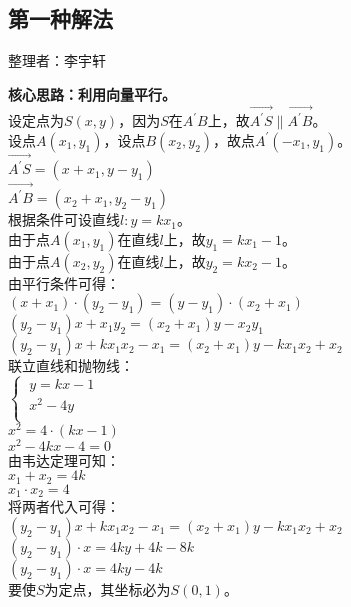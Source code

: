 \documentclass[UTF8]{ctexart}
\begin{document}
\newpage

\subsection{第一种解法}
    \begin{center}
        整理者：李宇轩
    \end{center}
    \begin{multicols}{2}
        \small
        \textbf{核心思路：利用向量平行。}\\[5mm]
        设定点为$S(x,y)$，因为$S$在$A^{'}B$上，故$\overrightarrow{A^{'}S}\parallel\overrightarrow{A^{'}B}$。\\[5mm]
        设点$A(x_1,y_1)$，设点$B(x_2,y_2)$，故点$A^{'}(-x_1,y_1)$。\\[5mm]
        $\overrightarrow{A^{'}S}=(x+x_1,y-y_1)$\\[5mm]
        $\overrightarrow{A^{'}B}=(x_2+x_1,y_2-y_1)$\\[7mm]
        根据条件可设直线$l:y=kx_1$。\\[5mm]
        由于点$A(x_1,y_1)$在直线$l$上，故$y_1=kx_1-1$。\\[5mm]
        由于点$A(x_2,y_2)$在直线$l$上，故$y_2=kx_2-1$。\\[8mm]
        由平行条件可得：\\[3mm]
        $(x+x_1)\cdot (y_2-y_1)=(y-y_1)\cdot (x_2+x_1)$\\[5mm]
        $(y_2-y_1) x+x_1y_2=(x_2+x_1) y-x_2y_1$\\[5mm]
        $(y_2-y_1) x+kx_1x_2-x_1=(x_2+x_1) y-kx_1x_2+x_2$\\[8mm]
        联立直线和抛物线：\\[4mm]
        \begin{math}
            \begin{cases}
                ~y=kx-1\\[1mm]
                ~x^2-4y\\[1mm]
            \end{cases}
        \end{math}\\[5mm]
        $x^2=4\cdot(kx-1)$\\[5mm]
        $x^2-4kx-4=0$\\[8mm]
        由韦达定理可知：\\[3mm]
        $x_1+x_2=4k$\\[5mm]
        $x_1\cdot x_2=4$\\[8mm]
        将两者代入可得：\\[3mm]
        $(y_2-y_1) x+kx_1x_2-x_1=(x_2+x_1) y-kx_1x_2+x_2$\\[5mm]
        $(y_2-y_1)\cdot x=4ky+4k-8k$\\[5mm]
        $(y_2-y_1)\cdot x=4ky-4k$\\[5mm]
        要使$S$为定点，其坐标必为$S(0,1)$。
        \newpage
    \end{multicols}
\end{document}
